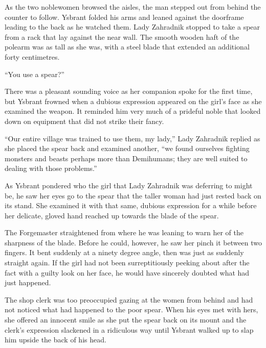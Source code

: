  

As the two noblewomen browsed the aisles, the man stepped out from behind the counter to follow. Ysbrant folded his arms and leaned against the doorframe leading to the back as he watched them. Lady Zahradnik stopped to take a spear from a rack that lay against the near wall. The smooth wooden haft of the polearm was as tall as she was, with a steel blade that extended an additional forty centimetres.

 

“You use a spear?”

 

There was a pleasant sounding voice as her companion spoke for the first time, but Ysbrant frowned when a dubious expression appeared on the girl’s face as she examined the weapon. It reminded him very much of a prideful noble that looked down on equipment that did not strike their fancy.

 

“Our entire village was trained to use them, my lady,” Lady Zahradnik replied as she placed the spear back and examined another, “we found ourselves fighting monsters and beasts perhaps more than Demihumans; they are well suited to dealing with those problems.”

 

As Ysbrant pondered who the girl that Lady Zahradnik was deferring to might be, he saw her eyes go to the spear that the taller woman had just rested back on its stand. She examined it with that same, dubious expression for a while before her delicate, gloved hand reached up towards the blade of the spear.

 

The Forgemaster straightened from where he was leaning to warn her of the sharpness of the blade. Before he could, however, he saw her pinch it between two fingers. It bent suddenly at a ninety degree angle, then was just as suddenly straight again. If the girl had not been surreptitiously peeking about after the fact with a guilty look on her face, he would have sincerely doubted what had just happened.

 

The shop clerk was too preoccupied gazing at the women from behind and had not noticed what had happened to the poor spear. When his eyes met with hers, she offered an innocent smile as she put the spear back on its mount and the clerk’s expression slackened in a ridiculous way until Ysbrant walked up to slap him upside the back of his head.

